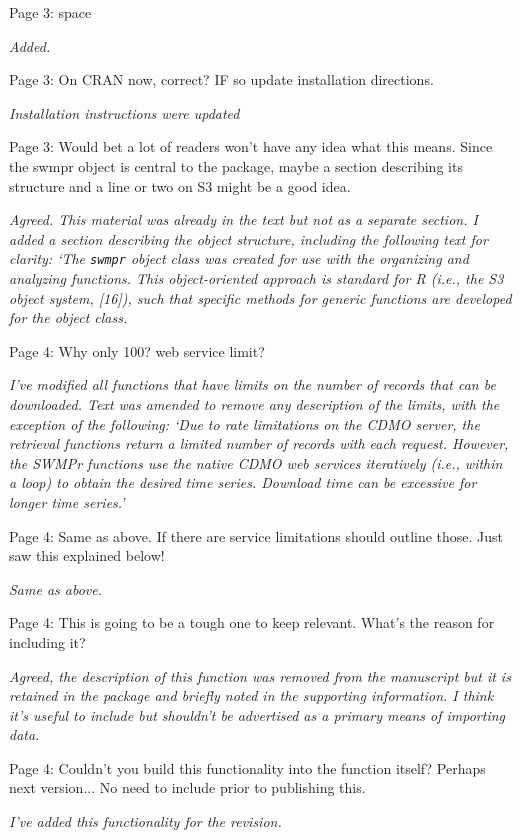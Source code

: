 \documentclass[letterpaper,12pt]{article}\usepackage[]{graphicx}\usepackage[]{color}
\begin{document}
Page 3: space

{\it Added.}

Page 3: On CRAN now, correct? IF so update installation directions.

{\it Installation instructions were updated}
 
Page 3: Would bet a lot of readers won't have any idea what this means. Since the swmpr object is central to the package, maybe a section describing its structure and a line or two on S3 might be a good idea.

{\it Agreed.  This material was already in the text but not as a separate section.  I added a section describing the object structure, including the following text for clarity: `The \texttt{swmpr} object class was created for use with the organizing and analyzing functions.  This object-oriented approach is standard for R (i.e., the S3 object  system, [16]), such that specific methods for generic functions are developed for the object class.}  

Page 4: Why only 100? web service limit?

{\it I've modified all functions that have limits on the number of records that can be downloaded.  Text was amended to remove any description of the limits, with the exception of the following: `Due to rate limitations on the CDMO server, the retrieval functions return a limited number of records with each request.  However, the SWMPr functions use the native CDMO web services iteratively (i.e., within a loop) to obtain the desired time series.  Download time can be excessive for longer time series.'}

Page 4: Same as above. If there are service limitations should outline those. Just saw this explained below!

{\it Same as above.}

Page 4: This is going to be a tough one to keep relevant. What's the reason for including it?

{\it Agreed, the description of this function was removed from the manuscript but it is retained in the package and briefly noted in the supporting information.  I think it's useful to include but shouldn't be advertised as a primary means of importing data.}

Page 4: Couldn't you build this functionality into the function itself? Perhaps next version... No need to include prior to publishing this.

{\it I've added this functionality for the revision.}
\end{document}

